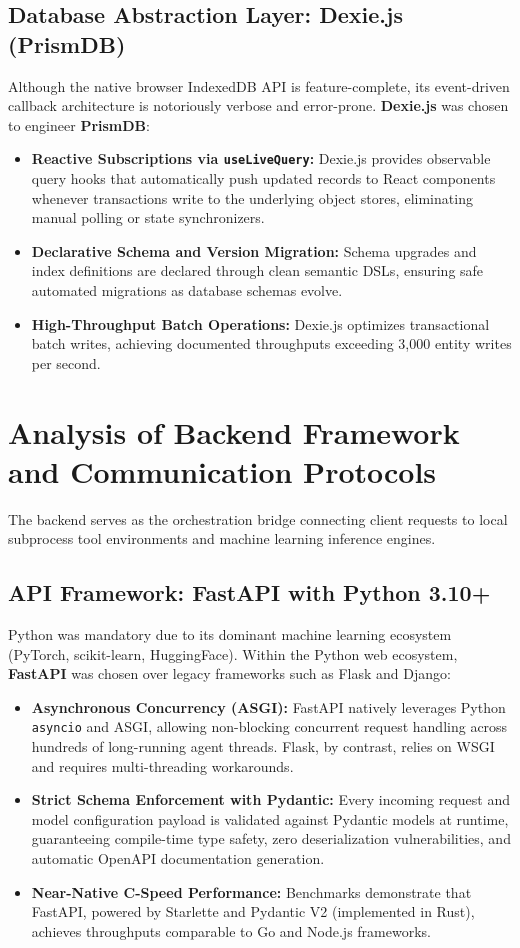 \documentclass[12pt,a4paper]{report}
\begin{document}
\subsection{Database Abstraction Layer: Dexie.js (PrismDB)}
Although the native browser IndexedDB API is feature-complete, its event-driven callback architecture is notoriously verbose and error-prone. \textbf{Dexie.js} was chosen to engineer \textbf{PrismDB}:
\begin{itemize}
    \item \textbf{Reactive Subscriptions via \texttt{useLiveQuery}:} Dexie.js provides observable query hooks that automatically push updated records to React components whenever transactions write to the underlying object stores, eliminating manual polling or state synchronizers.
    \item \textbf{Declarative Schema and Version Migration:} Schema upgrades and index definitions are declared through clean semantic DSLs, ensuring safe automated migrations as database schemas evolve.
    \item \textbf{High-Throughput Batch Operations:} Dexie.js optimizes transactional batch writes, achieving documented throughputs exceeding 3,000 entity writes per second.
\end{itemize}

\section{Analysis of Backend Framework and Communication Protocols}
The backend serves as the orchestration bridge connecting client requests to local subprocess tool environments and machine learning inference engines.

\subsection{API Framework: FastAPI with Python 3.10+}
Python was mandatory due to its dominant machine learning ecosystem (PyTorch, scikit-learn, HuggingFace). Within the Python web ecosystem, \textbf{FastAPI} was chosen over legacy frameworks such as Flask and Django:
\begin{itemize}
    \item \textbf{Asynchronous Concurrency (ASGI):} FastAPI natively leverages Python \texttt{asyncio} and ASGI, allowing non-blocking concurrent request handling across hundreds of long-running agent threads. Flask, by contrast, relies on WSGI and requires multi-threading workarounds.
    \item \textbf{Strict Schema Enforcement with Pydantic:} Every incoming request and model configuration payload is validated against Pydantic models at runtime, guaranteeing compile-time type safety, zero deserialization vulnerabilities, and automatic OpenAPI documentation generation.
    \item \textbf{Near-Native C-Speed Performance:} Benchmarks demonstrate that FastAPI, powered by Starlette and Pydantic V2 (implemented in Rust), achieves throughputs comparable to Go and Node.js frameworks.
\end{itemize}
\end{document}
